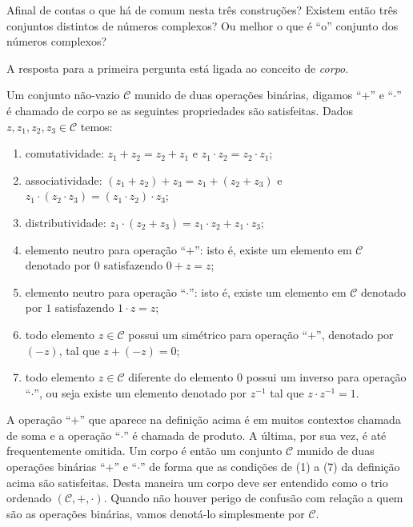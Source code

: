 Afinal de contas o que há de comum nesta três construções? Existem então três conjuntos distintos 
de números complexos? Ou melhor o que é ``o'' conjunto dos números complexos?


A resposta para a primeira pergunta está ligada ao conceito de \textit{corpo}. 


\begin{definicao}[Corpo] 
Um conjunto não-vazio $\mathscr{C}$ munido de duas operações 
binárias, digamos ``$+$'' e ``$\cdot$'' é chamado de corpo se as seguintes propriedades são satisfeitas.
Dados $z,z_1,z_2,z_3\in \mathscr{C}$ temos:
\begin{enumerate}[\bf (1)] 
\item comutatividade: $z_1+z_2=z_2+z_1$ \quad e \quad $z_1\cdot z_2 = z_2\cdot z_1$;

\item associatividade: $(z_1+z_2)+z_3 = z_1+(z_2+z_3)$ 
\quad e \quad $z_1\cdot(z_2\cdot z_3)=(z_1\cdot z_2)\cdot z_3$;

\item distributividade: $z_1\cdot (z_2+z_3)=z_1\cdot z_2+ z_1\cdot z_3$;

\item elemento neutro para operação ``$+$'': isto é, existe um elemento em $\mathscr{C}$ denotado por $0$
satisfazendo $0+z=z$;

\item elemento neutro para operação ``$\cdot$'': isto é, existe um elemento em $\mathscr{C}$ denotado por $1$
satisfazendo $1\cdot z=z$;

\item todo elemento $z\in \mathscr{C}$ possui um simétrico para operação ``$+$'', denotado por $(-z)$, tal que 
$z+(-z)=0$;

\item  todo elemento $z\in \mathscr{C}$ diferente do elemento $0$ possui um inverso para operação ``$\cdot$'', ou seja
existe um elemento denotado por $z^{-1}$ tal que $z\cdot z^{-1}=1$. 
\end{enumerate}
\end{definicao}

A operação ``$+$'' que aparece na definição acima é em muitos contextos chamada de soma e a operação
``$\cdot$'' é chamada de produto. A última, por sua vez, é até frequentemente omitida. 
Um corpo é então um conjunto $\mathscr{C}$ munido de duas operações binárias ``$+$'' e ``$\cdot$''
de forma que as condições de (1) a (7) da definição acima são satisfeitas.
Desta maneira um corpo deve ser entendido como o trio ordenado $(\mathscr{C},+,\cdot)$. 
Quando não houver perigo de confusão com relação a quem são as operações binárias,
vamos denotá-lo simplesmente por $\mathscr{C}$.

